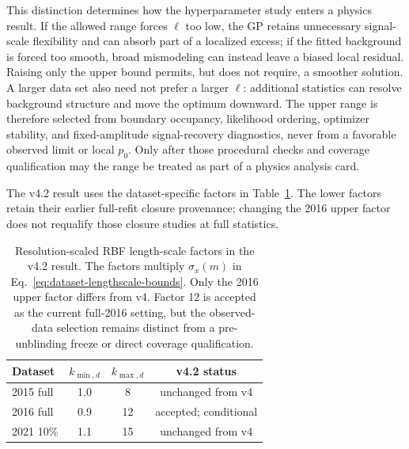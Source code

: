 This distinction determines how the hyperparameter study enters a physics result.
If the allowed range forces $\ell$ too low, the GP retains unnecessary
signal-scale flexibility and can absorb part of a localized excess; if the fitted
background is forced too smooth, broad mismodeling can instead leave a biased local
residual. Raising only the upper bound permits, but does not require, a smoother
solution. A larger data set also need not prefer a larger $\ell$: additional
statistics can resolve background structure and move the optimum downward. The
upper range is therefore selected from boundary occupancy, likelihood ordering,
optimizer stability, and fixed-amplitude signal-recovery diagnostics, never from a
favorable observed limit or local $p_0$. Only after those procedural checks and
coverage qualification may the range be treated as part of a physics analysis
card.

The v4.2 result uses the dataset-specific factors in
Table~\ref{tab:production-lengthscale-bounds}. The lower factors retain their earlier
full-refit closure provenance; changing the 2016 upper factor does not requalify those
closure studies at full statistics.

\begin{table}[H]
\centering
\begin{tabular}{lccc}
\toprule
Dataset & $k_{\min,d}$ & $k_{\max,d}$ & v4.2 status \\
\midrule
2015 full & 1.0 & 8 & unchanged from v4 \\
2016 full & 0.9 & 12 & accepted; conditional \\
2021 10\% & 1.1 & 15 & unchanged from v4 \\
\bottomrule
\end{tabular}
\caption{Resolution-scaled RBF length-scale factors in the v4.2 result. The
factors multiply $\sigma_x(m)$ in
Eq.~\eqref{eq:dataset-lengthscale-bounds}. Only the 2016 upper factor differs from
v4. Factor 12 is accepted as the current full-2016 setting, but the
observed-data selection remains distinct from a pre-unblinding freeze or direct
coverage qualification.}
\label{tab:production-lengthscale-bounds}
\end{table}

